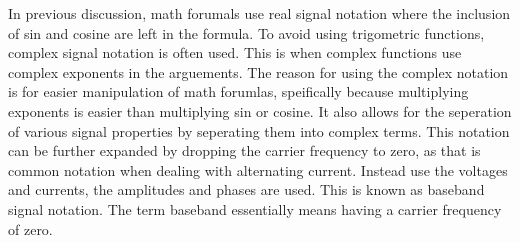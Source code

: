 \documentclass[12pt]{article}
\begin{document}
In previous discussion, math forumals use real signal notation where the inclusion of sin and cosine are left in the formula. To avoid using trigometric functions, complex signal notation is often used. This is when complex functions use complex exponents in the arguements. The reason for using the complex notation is for easier manipulation of math forumlas, speifically because multiplying exponents is easier than multiplying sin or cosine. It also allows for the seperation of various signal properties by seperating them into complex terms. This notation can be further expanded by dropping the carrier frequency to zero, as that is common notation when dealing with alternating current. Instead use the voltages and currents, the amplitudes and phases are used. This is known as baseband signal notation. The term baseband essentially means having a carrier frequency of zero. 

\end{document}
